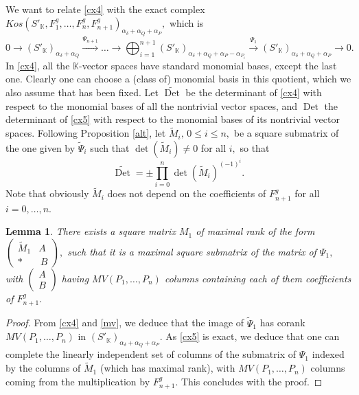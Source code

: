 \documentclass[a4paper,11pt]{amsart}
\newcommand{\Det}{\operatorname{Det}}
\newcommand{\K}{\mathbb{K}}
\newcounter{thm}
\numberwithin{thm}{section}
\numberwithin{equation}{section}
\theoremstyle{definition}
\theoremstyle{plain}
\newtheorem{lemma}[thm]{Lemma}
\begin{document}
We want to relate \eqref{cx4} with the exact complex $Kos(S'_\K,F^g_1,\ldots, F^g_{n}, F^g_{n+1})_{\alpha_\delta+\alpha_Q+\alpha_P},$ which is
\begin{equation}\label{cx5}
0\to{(S'_\K)}_{\alpha_\delta+\alpha_Q}\stackrel{\Psi_{n+1}}{\to} \ldots\to\bigoplus_{i=1}^{n+1} (S'_\K)_{\alpha_\delta+\alpha_Q+\alpha_P-\alpha_{P_i}}\stackrel{\Psi_{1}}{\to} (S'_\K)_{\alpha_\delta+\alpha_Q+\alpha_P}\to0.
\end{equation}
In \eqref{cx4}, all the $\K$-vector spaces have standard monomial bases, except the last one. Clearly one can choose a (class of) monomial basis in this quotient, which we also assume that has been fixed. Let $\widetilde{\Det}$ be the determinant of \eqref{cx4} with respect to the monomial bases of all the nontrivial vector spaces, and $\Det$ the determinant of \eqref{cx5} with respect to the monomial bases of its nontrivial vector spaces.  Following Proposition \ref{alt}, let $\tilde{M}_i,\, 0\leq i\leq n,$ be a square submatrix of the one given by $\tilde{\Psi}_{i}$ such that $\det(\tilde{M}_i)\neq0$ for all $i,$ so that
$$\widetilde{\Det}=\pm\prod_{i=0}^n \det(\tilde{M}_i)^{(-1)^{i}}.
$$
Note that obviously $\tilde{M}_i$ does not depend on the coefficients of $F^g_{n+1}$ for all $i=0,\ldots,n.$
\begin{lemma}\label{aucs}
There exists a square matrix $M_1$ of maximal rank of the form $\begin{pmatrix}\tilde{M}_1& A\\
* &\,B\end{pmatrix},$ such that it is a maximal square submatrix of the matrix of $\Psi_{1},$ with $\begin{pmatrix} A\\B\end{pmatrix}$ having $MV(P_1,\ldots, P_n)$ columns containing each of them coefficients of $F^g_{n+1}.$
\end{lemma}
\begin{proof}
From \eqref{cx4} and \eqref{mv}, we deduce that the image of $\tilde{\Psi}_{1}$ has corank $MV(P_1,\ldots, P_n)$ in $(S'_\K)_{\alpha_\delta+\alpha_Q+\alpha_P}.$ As \eqref{cx5} is exact, we deduce that one can complete the linearly independent set of columns of  the submatrix of $\Psi_{1}$  indexed by the columns of $\tilde{M}_1$ (which has maximal rank),  with $MV(P_1,\ldots, P_n)$ columns  coming from the multiplication by $F^g_{n+1}$. This concludes with the proof.
\end{proof}
\end{document}
